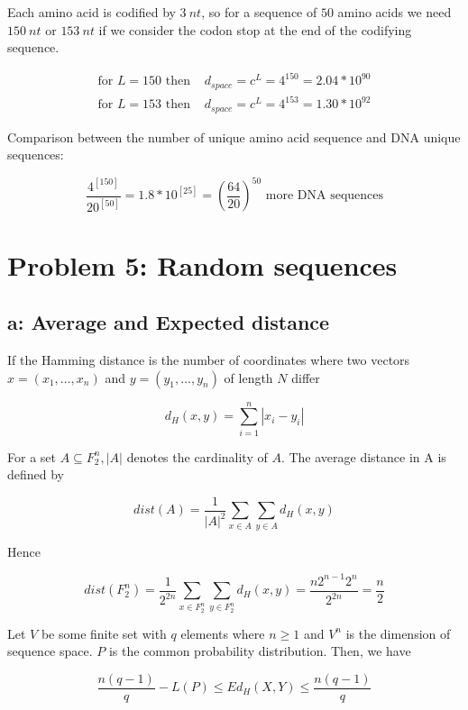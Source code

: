 Each amino acid is codified by $3~nt$, so for a sequence of $50$ amino acids we need $150~nt$ or $153~nt$ if we consider the codon stop at the end of the codifying sequence.

\begin{align}
\text{for } L = 150 \text{ then } &d_{space} = c^L =  4^{150} = 2.04*10^{90}\\
\text{for } L = 153 \text{ then } &d_{space} = c^L =  4^{153} = 1.30*10^{92}
\end{align}

Comparison between the number of unique amino acid sequence and DNA unique sequences:

\[ \frac{4^[150]}{20^[50]} = 1.8 *10^[25] = (\frac{64}{20})^50 \text{ more DNA sequences} \]

\setcounter{chapter}{5}
\setcounter{section}{0}
\section{Problem 5: Random sequences}

\subsection{a: Average and Expected distance}

If the Hamming distance is the number of coordinates where two vectors $x = (x_1,\dots,x_n) $ and $y = (y_1, \dots, y_n)$ of length $N$ differ

\[  d_H(x,y) = \sum\limits_{i=1}^{n} | x_i -y_i |\]

For a set $A \subseteq  F^{n}_{2}, |A|$ denotes the cardinality of $A$. The average distance in A is defined by 

\begin{equation}
dist(A) = \frac{1}{|A|^2}\sum\limits_{x\in A}\sum\limits_{y\in A} d_H(x,y)
\end{equation}

Hence 

\begin{equation}
dist(F^{n}_{2}) = \frac{1}{2^{2n}}\sum\limits_{x\in F^{n}_{2}}\sum\limits_{y\in F^{n}_{2}} d_H(x,y) = \frac{n2^{n-1}2^n}{2^{2n}} = \frac{n}{2}
\end{equation}

Let $V$ be some finite set with $q$ elements where $n \geq 1$ and $V^n$ is the dimension of sequence space.  $P$ is the common probability distribution. Then, we have

\[  \frac{n(q-1)}{q} - L(P) \leq Ed_H(X,Y) \leq \frac{n(q-1)}{q} \]

